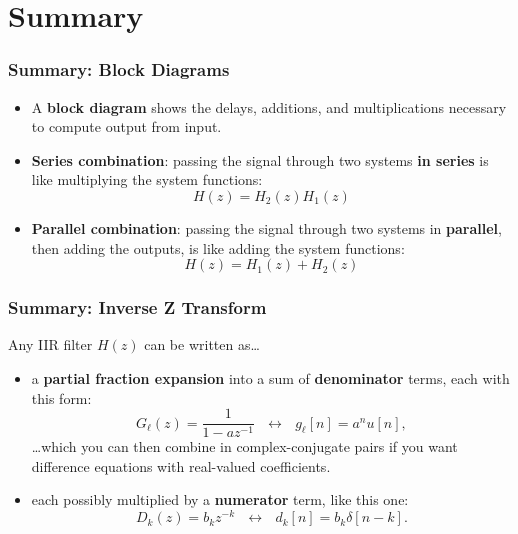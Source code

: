 \documentclass{beamer}
\begin{document}
\section[Summary]{Summary}
\setcounter{subsection}{1}

\begin{frame}
  \frametitle{Summary: Block Diagrams}
  \begin{itemize}
  \item A {\bf block diagram} shows the delays, additions, and
    multiplications necessary to compute output from input.
  \item {\bf Series combination}: passing the signal through two
    systems {\bf in series} is like multiplying the system functions:
    \[
    H(z)=H_2(z)H_1(z)
    \]
  \item {\bf Parallel combination}: passing the signal through two
    systems in {\bf parallel}, then adding the outputs, is like adding
    the system functions:
    \[
    H(z) = H_1(z)+H_2(z)
    \]
  \end{itemize}
\end{frame}
  
\begin{frame}
  \frametitle{Summary: Inverse Z Transform}

  Any IIR filter $H(z)$ can be written as\ldots
  \begin{itemize}
  \item a {\bf partial fraction expansion} into a sum of {\bf
    denominator} terms, each with this form:
    \begin{displaymath}
      G_\ell(z)=\frac{1}{1-az^{-1}}~~~\leftrightarrow~~~g_\ell[n]= a^nu[n],
    \end{displaymath}
    \ldots which you can then combine in complex-conjugate pairs if you want
    difference equations with real-valued coefficients.
  \item each possibly multiplied by a {\bf numerator} term, like this one:
    \begin{displaymath}
      D_k(z)=b_kz^{-k}~~~\leftrightarrow~~~d_k[n]=b_k\delta[n-k].
    \end{displaymath}
  \end{itemize}
\end{frame}
\end{document}

